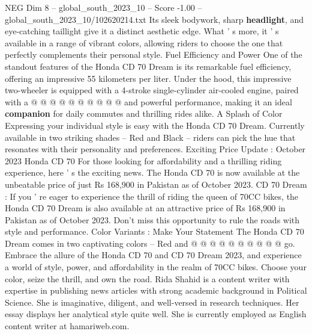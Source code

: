 \begin{textsample}{NEG Dim 8 – global\_south\_2023\_10 – Score -1.00 – global\_south\_2023\_10/102620214.txt}
Its sleek bodywork, sharp \textbf{headlight}, and eye-catching taillight give it a distinct aesthetic edge.
What ' s more, it ' s available in a range of vibrant colors, allowing riders to choose the one that perfectly complements their personal style.
Fuel Efficiency and Power One of the standout features of the Honda CD 70 Dream is its remarkable fuel efficiency, offering an impressive 55 kilometers per liter.
Under the hood, this impressive two-wheeler is equipped with a 4-stroke single-cylinder air-cooled engine, paired with a @ @ @ @ @ @ @ @ @ @ and powerful performance, making it an ideal \textbf{companion} for daily commutes and thrilling rides alike.
A Splash of Color Expressing your individual style is easy with the Honda CD 70 Dream.
Currently available in two striking shades -- Red and Black -- riders can pick the hue that resonates with their personality and preferences.
Exciting Price Update : October 2023 Honda CD 70 For those looking for affordability and a thrilling riding experience, here ' s the exciting news.
The Honda CD 70 is now available at the unbeatable price of just Rs 168,900 in Pakistan as of October 2023.
CD 70 Dream : If you ' re eager to experience the thrill of riding the queen of 70CC bikes, the Honda CD 70 Dream is also available at an attractive price of Rs 168,900 in Pakistan as of October 2023.
Don't miss this opportunity to rule the roads with style and performance.
Color Variants : Make Your Statement The Honda CD 70 Dream comes in two captivating colors -- Red and @ @ @ @ @ @ @ @ @ @ go.
Embrace the allure of the Honda CD 70 and CD 70 Dream 2023, and experience a world of style, power, and affordability in the realm of 70CC bikes.
Choose your color, seize the thrill, and own the road.
Rida Shahid is a content writer with expertise in publishing news articles with strong academic background in Political Science.
She is imaginative, diligent, and well-versed in research techniques.
Her essay displays her analytical style quite well.
She is currently employed as English content writer at hamariweb.com.

\end{textsample}
